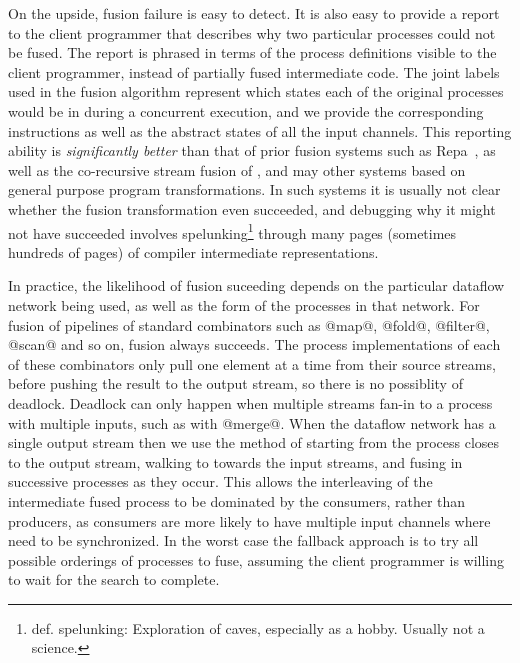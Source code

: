On the upside, fusion failure is easy to detect. It is also easy to provide a report to the client programmer that describes why two particular processes could not be fused. The report is phrased in terms of the process definitions visible to the client programmer, instead of partially fused intermediate code. The joint labels used in the fusion algorithm represent which states each of the original processes would be in during a concurrent execution, and we provide the corresponding instructions as well as the abstract states of all the input channels. This reporting ability is \emph{significantly better} than that of prior fusion systems such as Repa~\cite{lippmeier2012:guiding}, as well as the co-recursive stream fusion of \cite{coutts2007stream}, and may other systems based on general purpose program transformations. In such systems it is usually not clear whether the fusion transformation even succeeded, and debugging why it might not have succeeded involves spelunking\footnote{def. spelunking: Exploration of caves, especially as a hobby. Usually not a science.} through many pages (sometimes hundreds of pages) of compiler intermediate representations.

In practice, the likelihood of fusion suceeding depends on the particular dataflow network being used, as well as the form of the processes in that network. For fusion of pipelines of standard combinators such as @map@, @fold@, @filter@, @scan@ and so on, fusion always succeeds. The process implementations of each of these combinators only pull one element at a time from their source streams, before pushing the result to the output stream, so there is no possiblity of deadlock. Deadlock can only happen when multiple streams fan-in to a process with multiple inputs, such as with @merge@. When the dataflow network has a single output stream then we use the method of starting from the process closes to the output stream, walking to towards the input streams, and fusing in successive processes as they occur. This allows the interleaving of the intermediate fused process to be dominated by the consumers, rather than producers, as consumers are more likely to have multiple input channels where need to be synchronized. In the worst case the fallback approach is to try all possible orderings of processes to fuse, assuming the client programmer is willing to wait for the search to complete. 




